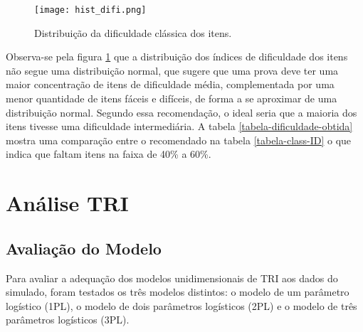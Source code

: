 \begin{figure}[H]
	\centering
	\caption{Distribuição da dificuldade clássica dos itens.}
	\texttt{[image: hist\_difi.png]}
	\parbox{\textwidth}{
		\centering %
	}
	\label{fig:hist_difi}
\end{figure}


Observa-se pela figura \ref{fig:hist_difi} que a distribuição dos índices de dificuldade dos itens não segue uma distribuição normal, que sugere que uma prova deve ter uma maior concentração de itens de dificuldade média, complementada por uma menor quantidade de itens fáceis e difíceis, de forma a se aproximar de uma distribuição normal. Segundo essa recomendação, o ideal seria que a maioria dos itens tivesse uma dificuldade intermediária. A tabela \ref{tabela-dificuldade-obtida} mostra uma comparação entre o recomendado na tabela \ref{tabela-class-ID} o que indica que faltam itens na faixa de 40\% a 60\%.

\begin{table}[H]
\end{table}


\newpage
\section{Análise TRI}

\subsection{Avaliação do Modelo}

Para avaliar a adequação dos modelos unidimensionais de TRI aos dados do simulado, foram
testados os três modelos distintos: o modelo de um parâmetro logístico (1PL), o modelo de dois parâmetros logísticos (2PL) e o modelo de três parâmetros logísticos (3PL).

